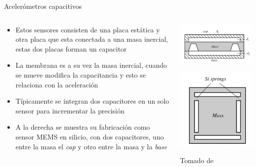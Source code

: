 \documentclass[aspectratio=169]{beamer}
\begin{document}
\begin{frame}{Acelerómetros capacitivos}
    \begin{columns}[c, onlytextwidth]
        \begin{column}{0.65\textwidth}
            \begin{itemize}
                \item Estos sensores consisten de una placa estática y otra placa que esta conectada a una masa inercial, estas dos placas forman un capacitor
                \item La membrana es a su vez la masa inercial, cuando se mueve modifica la capacitancia y esto se relaciona con la aceleración
                \item Típicamente se integran dos capacitores en un solo sensor para incrementar la precisión
                \item A la derecha se muestra su fabricación como sensor MEMS en silicio, con dos capacitores, uno entre la masa el \emph{cap} y otro entre la masa y la \emph{base}
            \end{itemize}
        \end{column}
        \begin{column}{0.35\textwidth}
            \centering
            \includegraphics[width = 0.8\linewidth]{fig/Fuerza_Vibracion/memscapacc.JPG}
            
            \includegraphics[width = 0.8\linewidth]{fig/Fuerza_Vibracion/memscapacc2.JPG}

            \tiny{Tomado de \cite{Fraden_2016}}
        \end{column}
    \end{columns}
\end{frame}
\end{document}

